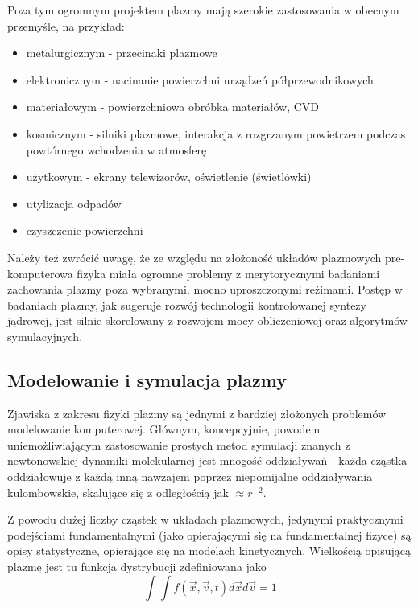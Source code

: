     Poza tym ogromnym projektem plazmy mają szerokie zastosowania w obecnym przemyśle, na przykład:
    \begin{itemize}
        \item metalurgicznym - przecinaki plazmowe 
        \item elektronicznym - nacinanie powierzchni urządzeń półprzewodnikowych 
        \item materiałowym - powierzchniowa obróbka materiałów, 
            CVD 
        \item kosmicznym - silniki plazmowe, interakcja z rozgrzanym powietrzem podczas powtórnego wchodzenia
            w atmosferę 
        \item użytkowym - ekrany telewizorów, oświetlenie (świetlówki)
        \item utylizacja odpadów 
        \item czyszczenie powierzchni 
    \end{itemize}

    Należy też zwrócić uwagę, że ze względu na złożoność układów plazmowych pre-komputerowa fizyka miała ogromne
    problemy z merytorycznymi badaniami zachowania plazmy poza wybranymi, mocno uproszczonymi reżimami. Postęp w badaniach
    plazmy, jak sugeruje rozwój technologii kontrolowanej syntezy jądrowej,
    jest silnie skorelowany 
    z rozwojem mocy obliczeniowej oraz algorytmów symulacyjnych.

    \subsection{Modelowanie i symulacja plazmy}

    Zjawiska z zakresu fizyki plazmy są jednymi z bardziej złożonych problemów modelowanie komputerowej.
    Głównym, koncepcyjnie, powodem uniemożliwiającym zastosowanie prostych metod symulacji
    znanych z newtonowskiej dynamiki molekularnej jest mnogość oddziaływań - każda cząstka oddziałowuje
    z każdą inną nawzajem poprzez niepomijalne oddziaływania kulombowskie, skalujące się z odległością jak
    $\approx r^{-2}$.

    Z powodu dużej liczby cząstek w układach plazmowych, jedynymi praktycznymi podejściami fundamentalnymi
    (jako opierającymi się na fundamentalnej fizyce) 
    są opisy statystyczne,
    opierające się na modelach kinetycznych. Wielkością opisującą plazmę jest tu funkcja dystrybucji zdefiniowana jako
    \begin{equation}
        \int \int f(\vec{x}, \vec{v}, t) d\vec{x} d\vec{v} = 1
        \label{eqn:distribution-function}
    \end{equation}

